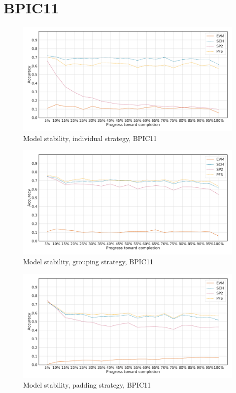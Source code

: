 \section*{BPIC11}
\begin{figure}[!htb]
    \centering
    \includegraphics[width=\textwidth]{gfx/bpic2011/individual_stability.pdf}
    \caption{Model stability, individual strategy, BPIC11}
    \label{fig:bpic11-individual-stability}
\end{figure}
\begin{figure}[!htb]
    \centering
    \includegraphics[width=\textwidth]{gfx/bpic2011/grouped_stability.pdf}
    \caption{Model stability, grouping strategy, BPIC11}
    \label{fig:bpic11-grouped-stability}
\end{figure}
\begin{figure}[!htb]
    \centering
    \includegraphics[width=\textwidth]{gfx/bpic2011/padded_stability.pdf}
    \caption{Model stability, padding strategy, BPIC11}
    \label{fig:bpic11-padded-stability}
\end{figure}
